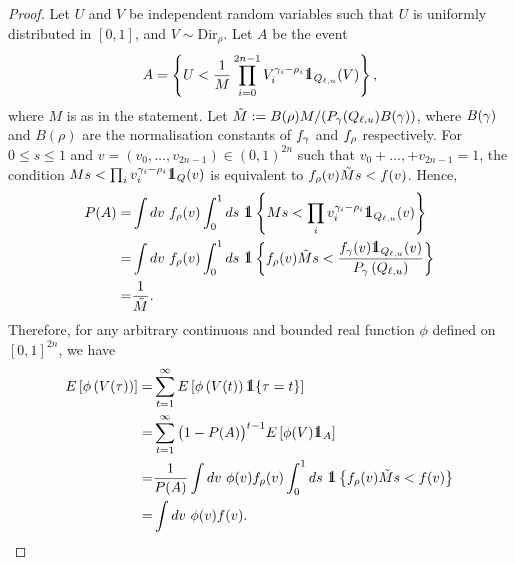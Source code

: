 \documentclass[10pt, article,table]{article}
\begin{document}
\begin{proof}
 Let $U$ and $V$ be independent random variables such that  $U$ is uniformly distributed in $[0,1]$, and $V \sim \text{Dir}_{\rho}$. Let $A$ be the event 
 \begin{equation*}
  A  =
  \left\lbrace
  U < \frac{1}{M} \prod_{i=0}^{2n-1} V_{i}^{\dirparam_i - \rho_i} \one_{Q_{\ell,u}}(V)  
  \right\rbrace,
 \end{equation*}
 where $M$ is as in the statement. Let $\tilde{M}:= B(\rho) M / (\Prob_{\dirparam}(Q_{\ell, u}) B(\dirparam) )$, where $B(\dirparam)$ and  $B(\rho)$ are the normalisation constants of $\dirichletDensity[\dirparam]$ and $\dirichletDensity[\rho]$ respectively.  For $0\leq s \leq 1$ and $v=(v_0,\dots,v_{2n-1}) \in (0,1)^{2n}$ such that $v_0 + \dots, + v_{2n-1} = 1 $, the condition $ M s < \prod_i v_{i}^{\dirparam_i - \rho_i} \one_{Q}(v)$ is equivalent to $\dirichletDensity[\rho](v) \tilde{M} s  < \targetDensity(v)$. Hence, 
 \begin{equation*}
  \begin{split}
   \Prob(A) = &
   \int dv \, \, \dirichletDensity[\rho](v)
   \int_{0}^{1}ds\, \, 
   \one\left\lbrace
   M s < \prod_i v_{i}^{\dirparam_i - \rho_i} \one_{Q_{\ell,u}}(v)
   \right\rbrace
   \\
   = &
   \int dv \,\, \dirichletDensity[\rho](v)
   \int_{0}^{1}ds \, \, 
   \one\left\lbrace
   \dirichletDensity[\rho](v) \tilde{M} s  < \frac{\dirichletDensity(v)\one _{Q_{\ell,u}} (v)}{\dirichletLaw\left(Q_{\ell,u}\right)}
   \right\rbrace
   \\
   = &
   \frac{1}{\tilde{M}}.
  \end{split}
 \end{equation*}
Therefore, for any arbitrary continuous and bounded real function $\phi$ defined on $[0,1]^{2n}$, we have
\begin{equation*}
 \begin{split}
  \Expectation\left[ \phi\left( V(\tau) \right)\right]
  = &
  \sum_{t=1}^{\infty} \Expectation\left[ \phi\left( V(t)\right) \one \lbrace \tau = t \rbrace \right]
  \\
  = & 
  \sum_{t=1}^{\infty} \big(1-\Prob(A)\big)^{t-1}\Expectation\left[ \phi(V)\one_{A}\right]
  \\
  = &
  \frac{1}{\Prob(A)}
  \int dv \,\,\phi(v) \dirichletDensity[\rho](v)
   \int_{0}^{1}ds \, \, 
   \one\left\lbrace
   \dirichletDensity[\rho](v) \tilde{M} s  < \targetDensity(v)
   \right\rbrace
   \\
   = &
   \int dv \,\, \phi(v)  \targetDensity(v).
 \end{split}
\end{equation*}
\end{proof}
\end{document}
